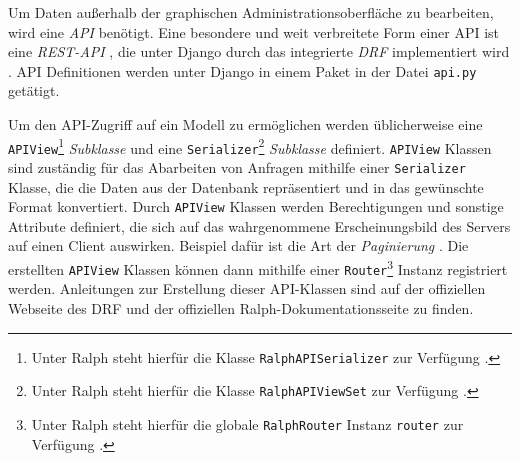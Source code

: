 Um Daten außerhalb der graphischen Administrationsoberfläche zu
bearbeiten, wird eine
\emph{API}
benötigt. Eine besondere und weit verbreitete Form einer API ist eine
\emph{REST-API}
\cite{rest-api}, die unter Django durch das integrierte
\emph{DRF}
implementiert wird \cite{django-rest-framework}. API Definitionen werden
unter Django in einem Paket in der Datei \texttt{api.py} getätigt.

Um den API-Zugriff auf ein Modell zu ermöglichen werden üblicherweise
eine \texttt{APIView}\footnote{Unter Ralph steht hierfür die Klasse
  \texttt{RalphAPISerializer} zur Verfügung \cite{ralph-api-doku}.}
\emph{Subklasse}
und eine \texttt{Serializer}\footnote{Unter Ralph steht hierfür die
  Klasse \texttt{RalphAPIViewSet} zur Verfügung \cite{ralph-api-doku}.}
\emph{Subklasse}
definiert. \texttt{APIView} Klassen sind zuständig für das Abarbeiten
von Anfragen mithilfe einer \texttt{Serializer} Klasse, die die Daten
aus der Datenbank repräsentiert und in das gewünschte Format
konvertiert. Durch \texttt{APIView} Klassen werden Berechtigungen und
sonstige Attribute definiert, die sich auf das wahrgenommene
Erscheinungsbild des Servers auf einen Client auswirken. Beispiel dafür
ist die Art der \emph{Paginierung}
\cite{django-rest-framework}.
Die erstellten \texttt{APIView} Klassen können dann mithilfe einer
\texttt{Router}\footnote{Unter Ralph steht hierfür die globale
  \texttt{RalphRouter} Instanz \texttt{router} zur Verfügung
  \cite{ralph-api-doku}.} Instanz registriert werden. Anleitungen zur
Erstellung dieser API-Klassen sind auf der offiziellen Webseite des DRF
\cite{django-rest-framework} und der offiziellen
Ralph-Dokumentationsseite \cite{ralph-api-doku} zu finden.

